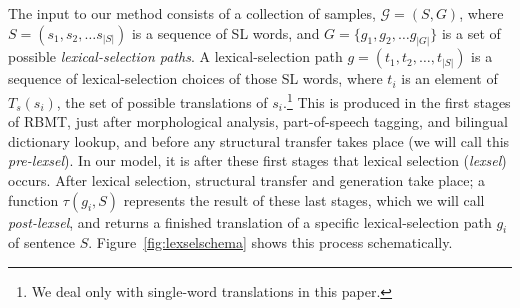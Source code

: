 \documentclass[11pt]{article}
\newcommand{\todomlf}[1]{\renewcommand{\baselinestretch}{0.55}\todo{\scriptsize\sf MLF: #1}\renewcommand{\baselinestretch}{1.0}}
\begin{document}
The input to our method consists of a collection of samples,
$\mathcal{G} = (S, G)$, where $S = (s_1, s_2, \ldots s_{|S|})$ is a
sequence of SL words, and $G = \{g_1, g_2, \ldots g_{|G|}\}$ is a set
of possible \emph{lexical-selection paths}. A lexical-selection path
$g = (t_1, t_2, \ldots, t_{|S|})$ is a sequence of lexical-selection
choices of those SL words, where \(t_i\) is an element of \(T_s(s_i)\), the set of possible translations of \(s_i\).\footnote{We deal only with single-word translations in this paper.}
This is produced in the first stages of RBMT, just after morphological
analysis, part-of-speech tagging, and bilingual dictionary lookup, and
before any structural transfer takes place (we will call this
\emph{pre-lexsel}). In our model, it is after these first stages that
lexical selection (\emph{lexsel}) occurs. After lexical selection,
structural transfer and generation take place; a function
$\tau(g_i,S)$ represents the result of these last stages, which we
will call \emph{post-lexsel}, and returns a finished translation of a
specific lexical-selection path $g_i$ of sentence
$S$. Figure~\ref{fig:lexselschema} shows this process
schematically. %
\end{document}
